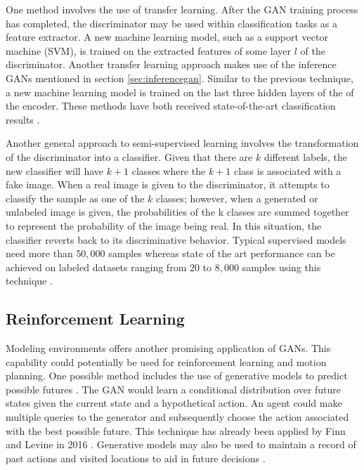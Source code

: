 \documentclass[11pt]{article}
\begin{document}
One method involves the use of transfer learning. After the GAN training process has completed, the discriminator may be used within classification tasks as a feature extractor. A new machine learning model, such as a support vector machine (SVM), is trained on the extracted features of some layer $l$ of the discriminator. Another transfer learning approach makes use of the inference GANs mentioned in section \ref{sec:inferencegan}. Similar to the previous technique, a new machine learning model is trained on the last three hidden layers of the of the encoder. These methods have both received state-of-the-art classification results \citep{2017arXiv171007035C}.

Another general approach to semi-supervised learning involves the transformation of the discriminator into a classifier. Given that there are $k$ different labels, the new classifier will have $k + 1$ classes where the $k + 1$ class is associated with a fake image. When a real image is given to the discriminator, it attempts to classify the sample as one of the $k$ classes; however, when a generated or unlabeled image is given, the probabilities of the k classes are summed together to represent the probability of the image being real. In this situation, the classifier reverts back to its discriminative behavior. Typical supervised models need more than $50,000$ samples whereas state of the art performance can be achieved on labeled datasets ranging from $20$ to $8,000$ samples using this technique \citep{2017arXiv170100160G}.

\subsection{Reinforcement Learning}
Modeling environments offers another promising application of GANs. This capability could potentially be used for reinforcement learning and motion planning. One possible method includes the use of generative models to predict possible futures \citep{2017arXiv170100160G}. The GAN would learn a conditional distribution over future states given the current state and a hypothetical action. An agent could make multiple queries to the generator and subsequently choose the action associated with the best possible future. This technique has already been applied by Finn and Levine in 2016 \citep{2016arXiv161000696F}. Generative models may also be used to maintain a record of past actions and visited locations to aid in future decisions \citep{2017arXiv170100160G}.
\end{document}
